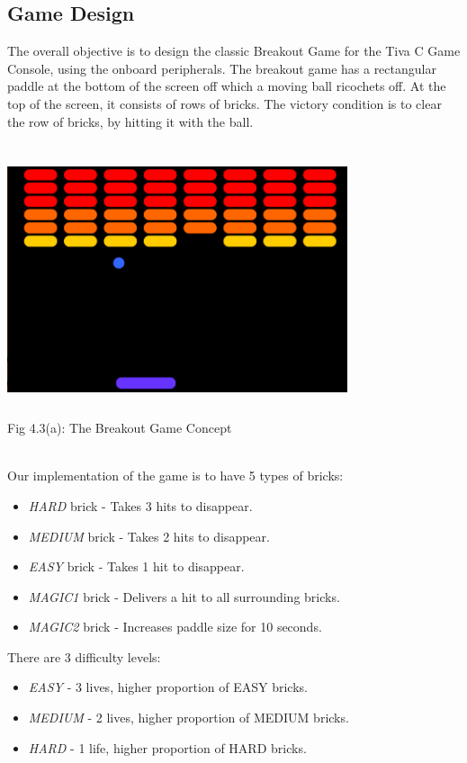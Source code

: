\documentclass[a4paper,12pt,oneside]{book}
\begin{document}
\subsection{Game Design}
\qquad The overall objective is to design the classic Breakout Game for the Tiva C Game Console, using the onboard peripherals.
The breakout game has a rectangular paddle at the bottom of the screen off which a moving ball ricochets off. At the top of the screen, it consists of rows of bricks. The victory condition is to clear the row of bricks, by hitting it with the ball. 
\begin{center}
\includegraphics[width=10cm, height=8cm]{BreakoutImages/BreakoutDesign} \\
\caption{Fig 4.3(a): The Breakout Game Concept}
\end{center}
\\ Our implementation of the game is to have 5 types of bricks:
\begin{itemize}
  \item \textit{HARD} brick - Takes 3 hits to disappear.
  \item \textit{MEDIUM} brick - Takes 2 hits to disappear.
  \item \textit{EASY} brick - Takes 1 hit to disappear.
  \item \textit{MAGIC1} brick - Delivers a hit to all surrounding bricks.
  \item \textit{MAGIC2} brick - Increases paddle size for 10 seconds.
\end{itemize}
There are 3 difficulty levels:
\begin{itemize}
  \item \textit{EASY} - 3 lives, higher proportion of EASY bricks.
  \item \textit{MEDIUM} - 2 lives, higher proportion of MEDIUM bricks.
  \item \textit{HARD} - 1 life, higher proportion of HARD bricks.
\end{itemize}
\end{document}
